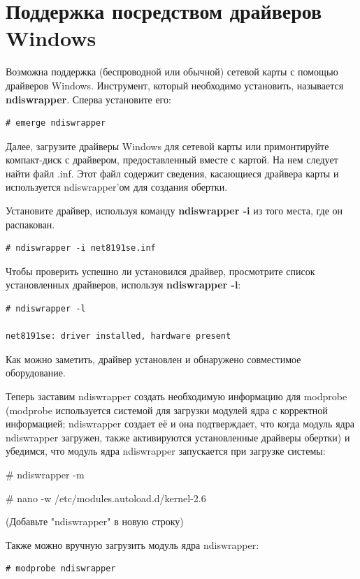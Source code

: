 \documentclass[10pt]{book}
\begin{document}
\section{Поддержка посредством драйверов Windows}
Возможна поддержка (беспроводной или обычной) сетевой карты с помощью драйверов Windows. Инструмент, который необходимо установить, называется \textbf{ndiswrapper}. Сперва установите его:

\begin{tcolorbox}
\begin{lstlisting}
# emerge ndiswrapper
\end{lstlisting}
\end{tcolorbox}
Далее, загрузите драйверы Windows для сетевой карты или примонтируйте компакт-диск с драйвером, предоставленный вместе с картой. На нем следует найти файл .inf. Этот файл содержит сведения, касающиеся драйвера карты и используется ndiswrapper'ом для создания обертки.

Установите драйвер, используя команду \textbf{ndiswrapper -i} из того места, где он распакован.

\begin{tcolorbox}
\begin{lstlisting}
# ndiswrapper -i net8191se.inf
\end{lstlisting}
\end{tcolorbox}

Чтобы проверить успешно ли установился драйвер, просмотрите список установленных драйверов, используя \textbf{ndiswrapper -l}:

\begin{tcolorbox}
\begin{lstlisting}
# ndiswrapper -l

net8191se: driver installed, hardware present
\end{lstlisting}
\end{tcolorbox}
Как можно заметить, драйвер установлен и обнаружено совместимое оборудование.

Теперь заставим ndiswrapper создать необходимую информацию для modprobe (modprobe используется системой для загрузки модулей ядра с корректной информацией; ndiswrapper создает её и она подтверждает, что когда модуль ядра ndiswrapper загружен, также активируются установленные драйверы обертки) и убедимся, что модуль ядра ndiswrapper запускается при загрузке системы:

\begin{tcolorbox}
\# ndiswrapper -m

\# nano -w /etc/modules.autoload.d/kernel-2.6

(Добавьте "ndiswrapper" в новую строку)
\end{tcolorbox}
Также можно вручную загрузить модуль ядра ndiswrapper:
\begin{tcolorbox}
\begin{lstlisting}
# modprobe ndiswrapper
\end{lstlisting}
\end{tcolorbox}
\end{document}
